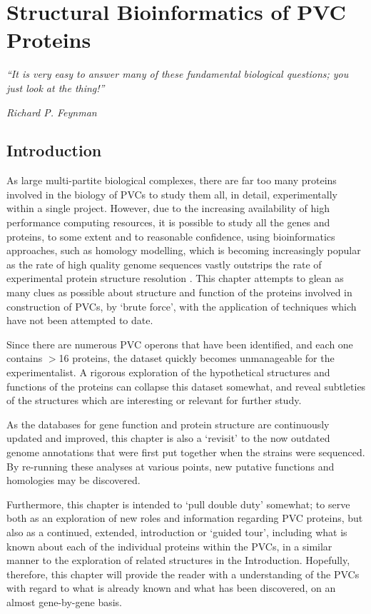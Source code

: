 \chapter{Structural Bioinformatics of PVC Proteins}\label{structbioinfo}

\epigraph{\emph{``It is very easy to answer many of these fundamental biological questions; you just look at the thing!''}}{\textit{Richard P. Feynman}}

\section{Introduction}

As large multi-partite biological complexes, there are far too many proteins involved in the biology of PVCs to study them all, in detail, experimentally within a single project. However, due to the increasing availability of high performance computing resources, it is possible to study all the genes and proteins, to some extent and to reasonable confidence, using bioinformatics approaches, such as homology modelling, which is becoming increasingly popular as the rate of high quality genome sequences vastly outstrips the rate of experimental protein structure resolution \citep{Rodriguez1998}. This chapter attempts to glean as many clues as possible about structure and function of the proteins involved in construction of PVCs, by `brute force', with the application of techniques which have not been attempted to date.

Since there are numerous PVC operons that have been identified, and each one contains $>$16 proteins, the dataset quickly becomes unmanageable for the experimentalist. A rigorous exploration of the hypothetical structures and functions of the proteins can collapse this dataset somewhat, and reveal subtleties of the structures which are interesting or relevant for further study. 

As the databases for gene function and protein structure are continuously updated and improved, this chapter is also a `revisit' to the now outdated genome annotations that were first put together when the strains were sequenced. By re-running these analyses at various points, new putative functions and homologies may be discovered.

Furthermore, this chapter is intended to `pull double duty' somewhat; to serve both as an exploration of new roles and information regarding PVC proteins, but also as a continued, extended, introduction or `guided tour', including what is known about each of the individual proteins within the PVCs, in a similar manner to the exploration of related structures in the Introduction. Hopefully, therefore, this chapter will provide the reader with a understanding of the PVCs with regard to what is already known and what has been discovered, on an almost gene-by-gene basis.

